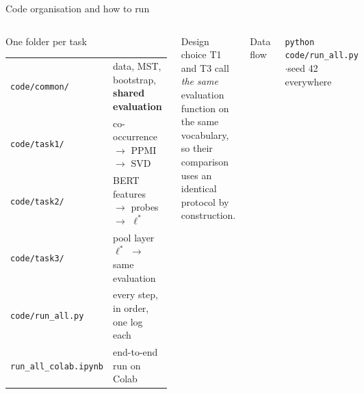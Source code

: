 \documentclass[aspectratio=169,9pt]{beamer}
\begin{document}
\begin{frame}[fragile]{Code organisation and how to run}
\begin{columns}[T,onlytextwidth]
  \begin{block}{One folder per task}
    \footnotesize
    \begin{tabular}{@{}ll@{}}
      \texttt{code/common/} & data, MST, bootstrap, \textbf{shared evaluation}\\
      \texttt{code/task1/} & co-occurrence $\to$ PPMI $\to$ SVD\\
      \texttt{code/task2/} & BERT features $\to$ probes $\to$ $\ell^*$\\
      \texttt{code/task3/} & pool layer $\ell^*$ $\to$ same evaluation\\
      \texttt{code/run\_all.py} & every step, in order, one log each\\
      \texttt{run\_all\_colab.ipynb} & end-to-end run on Colab\\
    \end{tabular}
  \end{block}
  \begin{exampleblock}{Design choice}
    \footnotesize T1 and T3 call \emph{the same} evaluation function on the same vocabulary, so their comparison uses an identical protocol by construction.
  \end{exampleblock}
  \begin{block}{Data flow}
    \centering
  \end{block}
  \vspace{0.1em}
  {\scriptsize\texttt{python code/run\_all.py}\quad$\cdot$\quad seed 42 everywhere}
\end{columns}
\end{frame}
\end{document}
